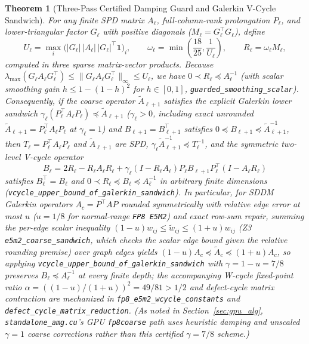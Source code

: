 \documentclass[10pt]{article}
\newtheorem{theorem}{Theorem}
\begin{document}
\begin{theorem}[Three-Pass Certified Damping Guard and Galerkin V-Cycle Sandwich]
For any finite SPD matrix $A_\ell$, full-column-rank prolongation $P_\ell$, and lower-triangular factor $G_\ell$ with positive diagonals ($M_\ell = G_\ell^\top G_\ell$), define
\[
  U_\ell = \max_i \bigl(|G_\ell|\,|A_\ell|\,|G_\ell|^\top \mathbf{1}\bigr)_i, \qquad
  \omega_\ell = \min\!\left(\frac{18}{25}, \frac{1}{U_\ell}\right), \qquad
  R_\ell = \omega_\ell M_\ell,
\]
computed in three sparse matrix-vector products. Because $\lambda_{\max}(G_\ell A_\ell G_\ell^\top) \le \|G_\ell A_\ell G_\ell^\top\|_\infty \le U_\ell$, we have $0 \prec R_\ell \preceq A_\ell^{-1}$ (with scalar smoothing gain $h \le 1 - (1-h)^2$ for $h \in [0,1]$, \texttt{guarded\_smoothing\_scalar}). Consequently, if the coarse operator $\tilde{A}_{\ell+1}$ satisfies the explicit Galerkin lower sandwich $\gamma_\ell (P_\ell^\top A_\ell P_\ell) \preceq \tilde{A}_{\ell+1}$ ($\gamma_\ell > 0$, including exact unrounded $\tilde{A}_{\ell+1} = P_\ell^\top A_\ell P_\ell$ at $\gamma_\ell = 1$) and $B_{\ell+1} = B_{\ell+1}^\top$ satisfies $0 \preceq B_{\ell+1} \preceq \tilde{A}_{\ell+1}^{-1}$, then $T_\ell = P_\ell^\top A_\ell P_\ell$ and $\tilde{A}_{\ell+1}$ are SPD, $\gamma_\ell \tilde{A}_{\ell+1}^{-1} \preceq T_\ell^{-1}$, and the symmetric two-level V-cycle operator
\[
  B_\ell = 2 R_\ell - R_\ell A_\ell R_\ell + \gamma_\ell (I - R_\ell A_\ell) P_\ell B_{\ell+1} P_\ell^\top (I - A_\ell R_\ell)
\]
satisfies $B_\ell^\top = B_\ell$ and $0 \prec R_\ell \preceq B_\ell \preceq A_\ell^{-1}$ in arbitrary finite dimensions (\texttt{vcycle\_upper\_bound\_of\_galerkin\_sandwich}). In particular, for SDDM Galerkin operators $A_c = P^\top A P$ rounded symmetrically with relative edge error at most $u$ ($u = 1/8$ for normal-range \texttt{FP8 E5M2}) and exact row-sum repair, summing the per-edge scalar inequality $(1-u)w_{ij} \le \tilde{w}_{ij} \le (1+u)w_{ij}$ (Z3 \texttt{e5m2\_coarse\_sandwich}, which checks the scalar edge bound given the relative rounding premise) over graph edges yields $(1-u)A_c \preceq \tilde{A}_c \preceq (1+u)A_c$, so applying \texttt{vcycle\_upper\_bound\_of\_galerkin\_sandwich} with $\gamma = 1 - u = 7/8$ preserves $B_\ell \preceq A_\ell^{-1}$ at every finite depth; the accompanying W-cycle fixed-point ratio $\alpha = ((1-u)/(1+u))^2 = 49/81 > 1/2$ and defect-cycle matrix contraction are mechanized in \texttt{fp8\_e5m2\_wcycle\_constants} and \texttt{defect\_cycle\_matrix\_reduction}. (As noted in Section~\ref{sec:gpu_alg}, \texttt{standalone\_amg.cu}'s GPU \texttt{fp8coarse} path uses heuristic damping and unscaled $\gamma = 1$ coarse corrections rather than this certified $\gamma = 7/8$ scheme.)
\end{theorem}
\end{document}

